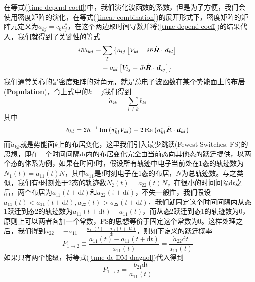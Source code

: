 \documentclass[12pt,a4paper,openany,twoside]{book}
\numberwithin{equation}{section}
\newcommand{\ud}{\mathrm{d}}
\begin{document}
        在等式(\ref{time-depend-coeff})中，我们演化波函数的系数，但是为了方便，我们会使用密度矩阵的演化，在等式(\ref{linear combination})的展开形式下，密度矩阵的矩阵元定义为$a_{kj}=c_k c_j^*$，在这个两边取时间导数并将(\ref{time-depend-coeff})的结果代入，我们就得到了关键性的等式
        \begin{equation}
          \begin{aligned}
            i \hbar \dot{a}_{k j}=& \sum_{T}\left\{a_{l j}\left[V_{k l}-i \hbar \dot{\vb*{R}} \cdot \vb*{d}_{k l}\right]\right.\\
            &-a_{k l}\left[V_{l j}-i \hbar \dot{\vb*{R}} \cdot \vb*{d}_{i j}\right] \}
          \end{aligned}
          \label{time-de DM}
        \end{equation}
        我们通常关心的是密度矩阵的对角元，就是总电子波函数在某个势能面上的\textbf{布居}(\textbf{Population})，令上式中的$k=j$我们得到
        \begin{equation}
          \dot{a}_{k k}=\sum_{l \neq k} b_{k l}
        \end{equation}
        其中
        \begin{equation}
          b_{k l}=2 \hbar^{-1} \operatorname{Im}\left(a_{k l}^{*} V_{k l}\right)-2 \operatorname{Re}\left(a_{k l}^{*} \dot{\vb*{R}} \cdot \vb*{d}_{k l}\right)
          \label{time-de DM diagnol}
        \end{equation}
        而$\dot{a}_{k k}$就是势能面$k$上的布居变化，这里我们引入最少跳跃(Fewest Switches, FS)的思想，即在一个时间间隔$\ud t$内的布居变化完全由当前态向其他态的跃迁提供，以两个态的体系为例，如果在时间$t$时，假设所有轨迹中电子当前处在1态的轨迹数为$N_1(t)=a_{11}(t)N$，其中$a_{11}$是$t$时刻电子在1态的布居，$N$为总轨迹数。与之类似，我们有$t$时刻处于2态的轨迹数$N_2(t)=a_{22}(t)N$，在很小的时间间隔$\ud t$之后，两个布居为$a_{11}(t+\ud t)$和$a_{22}(t+\ud t)$，不失一般性，我们假设$a_{11}(t)<a_{11}(t+\ud t),a_{22}(t)>a_{22}(t+\ud t)$，我们就固定这个时间间隔内从态1跃迁到态2的轨迹数为$a_{11}(t+\ud t)-a_{11}(t)$，而从态2跃迁到态1的轨迹数为$0$，原则上可以两者各加一个常数，FS的思想等价于固定这个常数为$0$。这样处理之后，我们得到$\dot{a}_{22}=-\dot{a}_{11}=\frac{a_{11}(t)-a_{11}(t+\ud t)}{\ud t}$，则如下定义的跃迁概率
        \begin{equation}
          P_{1\rightarrow2}\equiv\frac{a_{11}(t)-a_{11}(t+\ud t)}{a_{11}(t)}=\frac{\dot{a}_{22} \ud t }{ a_{11}(t)}
        \end{equation}
        如果只有两个能级，将等式(\ref{time-de DM diagnol})代入得到
        \begin{equation}
          P_{1\rightarrow2}=\frac{b_{21} \ud t }{ a_{11}(t)}
          \label{hopping probability}
        \end{equation}
\end{document}
